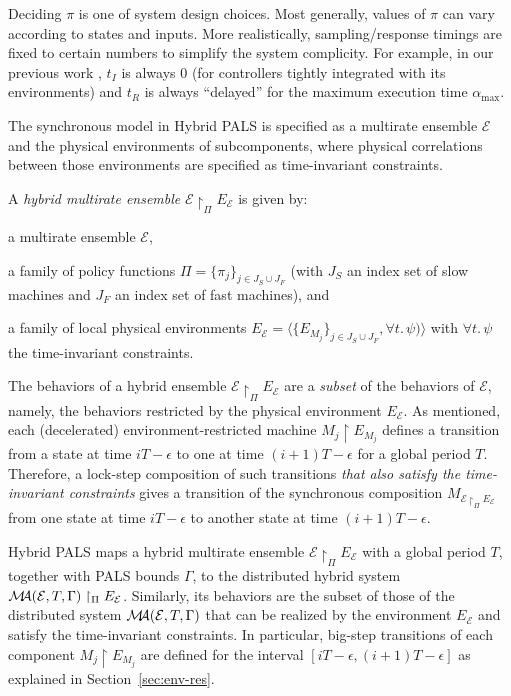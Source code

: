Deciding $\pi$ is one of system design choices. 
Most generally, values of $\pi$ can vary
according to states and inputs.
More realistically, sampling/response timings are fixed 
to certain numbers to simplify the system complicity.
For example, in our previous work \cite{hybrid-pals}, $t_I$ is always $0$ 
(for controllers tightly integrated with its environments)
and $t_R$ is always ``delayed'' for 
the maximum execution time $\alpha_{\max}$.


The synchronous model in Hybrid PALS is specified
as a multirate ensemble $\mathcal{E}$ and  the physical environments of subcomponents,
where physical correlations between those environments
are specified as time-invariant constraints.

\begin{definition}
A \emph{hybrid multirate ensemble} $\mathcal{E}\restriction_{\Pi} E_{\mathcal{E}}$
is given by:
\begin{inparaenum}[(i)]
    \item a multirate ensemble $\mathcal{E}$, %
    \item a family of policy functions $\Pi=\{\pi_j\}_{j\in J_S  \cup J_F}$
    (with $J_S$ an index set of slow machines and $J_F$ an index set of fast machines),
    and
    \item a family of local physical environments 
    $E_\mathcal{E} = \langle\{E_{M_j}\}_{j\in J_S \cup J_F}, \forall t.\, \psi)\rangle$ 
    with $\forall t.\,\psi$ the time-invariant constraints.
\end{inparaenum}
\end{definition}   


The behaviors of a hybrid ensemble  $\mathcal{E} \restriction_{\Pi} E_\mathcal{E}$
are  a \emph{subset} of the behaviors of $\mathcal{E}$, namely, the behaviors restricted by 
the physical environment $E_\mathcal{E}$.
As mentioned,
each (decelerated) environment-restricted machine $M_j \restriction E_{M_j}$ defines 
a transition from a state  at time $iT - \epsilon$ to one at time $(i+1)T-\epsilon$ for a global period $T$.
Therefore, a lock-step composition of such %
transitions
\emph{that also satisfy the time-invariant constraints} gives a transition of 
the synchronous composition $M_{\mathcal{E} \restriction_{\Pi} E_\mathcal{E}}$
from one state at time $iT - \epsilon$ to another state at time $(i+1)T-\epsilon$.


Hybrid PALS maps a hybrid multirate ensemble
$\mathcal{E}\restriction_{\Pi} E_\mathcal{E}$ with a global period $T$, 
together with PALS bounds $\Gamma$,  to the distributed hybrid system  
$\mathcal{M}\!\!\mathcal{A}(\mathcal{E}, T, \Gamma) \restriction_{\Pi} E_\mathcal{E}$.
Similarly, its  behaviors are the subset of those of the %
distributed system $\mathcal{M}\!\!\mathcal{A}(\mathcal{E}, T, \Gamma)$ that can be realized
by the %
environment $E_\mathcal{E}$
and satisfy the time-invariant constraints.
In particular, big-step transitions of each component $M_j \restriction E_{M_j}$ are
defined for the interval $[iT - \epsilon, (i+1)T-\epsilon]$
 as explained in Section~\ref{sec:env-res}.


